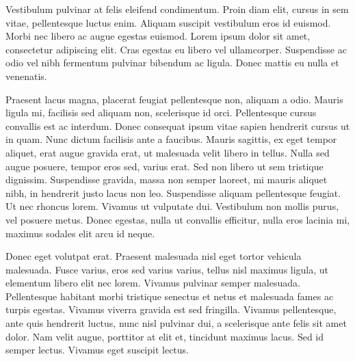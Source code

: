 \documentclass{article}
\begin{document}
Vestibulum pulvinar at felis eleifend condimentum. Proin diam elit, cursus in sem vitae, pellentesque luctus enim. Aliquam suscipit vestibulum eros id euismod. Morbi nec libero ac augue egestas euismod. Lorem ipsum dolor sit amet, consectetur adipiscing elit. Cras egestas eu libero vel ullamcorper. Suspendisse ac odio vel nibh fermentum pulvinar bibendum ac ligula. Donec mattis eu nulla et venenatis.

Praesent lacus magna, placerat feugiat pellentesque non, aliquam a odio. Mauris ligula mi, facilisis sed aliquam non, scelerisque id orci. Pellentesque cursus convallis est ac interdum. Donec consequat ipsum vitae sapien hendrerit cursus ut in quam. Nunc dictum facilisis ante a faucibus. Mauris sagittis, ex eget tempor aliquet, erat augue gravida erat, ut malesuada velit libero in tellus. Nulla sed augue posuere, tempor eros sed, varius erat. Sed non libero ut sem tristique dignissim. Suspendisse gravida, massa non semper laoreet, mi mauris aliquet nibh, in hendrerit justo lacus non leo. Suspendisse aliquam pellentesque feugiat. Ut nec rhoncus lorem. Vivamus ut vulputate dui. Vestibulum non mollis purus, vel posuere metus. Donec egestas, nulla ut convallis efficitur, nulla eros lacinia mi, maximus sodales elit arcu id neque.

Donec eget volutpat erat. Praesent malesuada nisl eget tortor vehicula malesuada. Fusce varius, eros sed varius varius, tellus nisl maximus ligula, ut elementum libero elit nec lorem. Vivamus pulvinar semper malesuada. Pellentesque habitant morbi tristique senectus et netus et malesuada fames ac turpis egestas. Vivamus viverra gravida est sed fringilla. Vivamus pellentesque, ante quis hendrerit luctus, nunc nisl pulvinar dui, a scelerisque ante felis sit amet dolor. Nam velit augue, porttitor at elit et, tincidunt maximus lacus. Sed id semper lectus. Vivamus eget suscipit lectus. 
\end{document}
